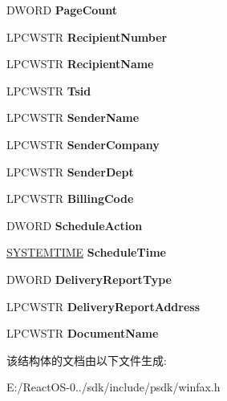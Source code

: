 \begin{DoxyCompactItemize}
D\+W\+O\+RD {\bfseries Page\+Count}
\item 
\mbox{\label{struct___f_a_x___j_o_b___e_n_t_r_y_w_a5035898493eb0d2e3a0a4389db451b3d}} 
L\+P\+C\+W\+S\+TR {\bfseries Recipient\+Number}
\item 
\mbox{\label{struct___f_a_x___j_o_b___e_n_t_r_y_w_a4074f4ae273d6896e07f0faeee27c9ed}} 
L\+P\+C\+W\+S\+TR {\bfseries Recipient\+Name}
\item 
\mbox{\label{struct___f_a_x___j_o_b___e_n_t_r_y_w_a5b8f4641bb0276770c181d00bfff6db2}} 
L\+P\+C\+W\+S\+TR {\bfseries Tsid}
\item 
\mbox{\label{struct___f_a_x___j_o_b___e_n_t_r_y_w_a2f4618553e3613e404af0ad4bcb7c662}} 
L\+P\+C\+W\+S\+TR {\bfseries Sender\+Name}
\item 
\mbox{\label{struct___f_a_x___j_o_b___e_n_t_r_y_w_a465cef129029824f88c2eea0a030fb14}} 
L\+P\+C\+W\+S\+TR {\bfseries Sender\+Company}
\item 
\mbox{\label{struct___f_a_x___j_o_b___e_n_t_r_y_w_aff18a7719d70434b2b019ef39bf65d14}} 
L\+P\+C\+W\+S\+TR {\bfseries Sender\+Dept}
\item 
\mbox{\label{struct___f_a_x___j_o_b___e_n_t_r_y_w_a17cf897d77a9cfcbc2f86a7e1e4a5eaa}} 
L\+P\+C\+W\+S\+TR {\bfseries Billing\+Code}
\item 
\mbox{\label{struct___f_a_x___j_o_b___e_n_t_r_y_w_a621228e8599cfca738d561e08021faa9}} 
D\+W\+O\+RD {\bfseries Schedule\+Action}
\item 
\mbox{\label{struct___f_a_x___j_o_b___e_n_t_r_y_w_ad45d08a3445a6e3e2973c6bb3210653c}} 
\hyperlink{struct___s_y_s_t_e_m_t_i_m_e}{S\+Y\+S\+T\+E\+M\+T\+I\+ME} {\bfseries Schedule\+Time}
\item 
\mbox{\label{struct___f_a_x___j_o_b___e_n_t_r_y_w_ae87d10bfd50dec4bb32fceaee4f772c1}} 
D\+W\+O\+RD {\bfseries Delivery\+Report\+Type}
\item 
\mbox{\label{struct___f_a_x___j_o_b___e_n_t_r_y_w_acce796de309e7196b945694f8ebf20d4}} 
L\+P\+C\+W\+S\+TR {\bfseries Delivery\+Report\+Address}
\item 
\mbox{\label{struct___f_a_x___j_o_b___e_n_t_r_y_w_a5f8d26b42689867d0efcdcfe38208ada}} 
L\+P\+C\+W\+S\+TR {\bfseries Document\+Name}
\end{DoxyCompactItemize}


该结构体的文档由以下文件生成\+:\begin{DoxyCompactItemize}
\item 
E\+:/\+React\+O\+S-\/0../sdk/include/psdk/winfax.\+h\end{DoxyCompactItemize}
